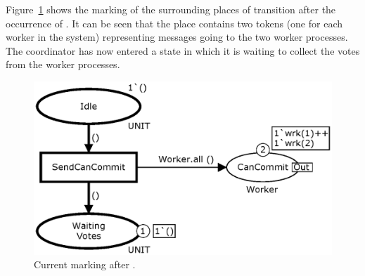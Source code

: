 
Figure~\ref{fig:sendcancommit} shows the marking of the surrounding
places of transition  after the occurrence of
. It can be seen that the place
 contains two tokens (one for each worker in the
system) representing messages going to the two worker processes. The
coordinator has now entered a state in which it is waiting to collect
the votes from the worker processes.

\begin{figure}[b]
\centering
\includegraphics[scale=.43]{figures/SendCanCommit.eps}
\caption{Current marking after .}
\label{fig:sendcancommit}
\end{figure}





